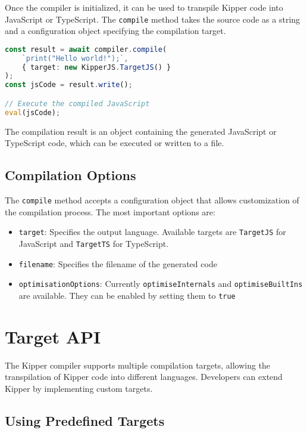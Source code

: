Once the compiler is initialized, it can be used to \gls{transpile} Kipper code into JavaScript or TypeScript. The \lstinline|compile| method takes the source code as a string and a configuration object specifying the compilation target.

\begin{lstlisting}[language=Typescript, caption=Compiling Kipper Code to JavaScript, label=lst:compile_example]
const result = await compiler.compile(
	`print("Hello world!");`,
	{ target: new KipperJS.TargetJS() }
);
const jsCode = result.write();

// Execute the compiled JavaScript
eval(jsCode);
\end{lstlisting}

The compilation result is an object containing the generated JavaScript or TypeScript code, which can be executed or written to a file.

\subsection{Compilation Options}
\label{subsec:compilation_options}

The \lstinline|compile| method accepts a configuration object that allows customization of the compilation process. The most important options are:

\begin{itemize}
	\item \lstinline|target|: Specifies the output language. Available targets are \lstinline|TargetJS| for JavaScript and \lstinline|TargetTS| for TypeScript.
	\item \lstinline|filename|: Specifies the filename of the generated code
	\item \lstinline|optimisationOptions|: Currently
	\lstinline|optimiseInternals| and \lstinline|optimiseBuiltIns| are available. They can be enabled by setting them to \lstinline|true|
\end{itemize}

\section{Target API}
\label{sec:target_api}

The Kipper compiler supports multiple compilation targets, allowing the \gls{transpilation} of Kipper code into different languages. Developers can extend Kipper by implementing custom targets.

\subsection{Using Predefined Targets}
\label{subsec:using_targets}


